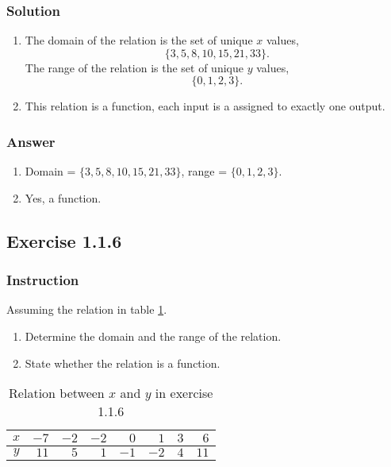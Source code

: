 \documentclass[11pt, letterpaper, oneside]{memoir}
\begin{document}
\subsubsection{Solution}

\begin{enumerate}[label=(\alph*)]
  \item The domain of the relation is the set of unique $ x $ values,
    $$ \phantom{.}
    \{ 3, 5, 8, 10, 15, 21, 33 \}
    .$$
    The range of the relation is the set of unique $ y $ values,
    $$ \phantom{.}
    \{ 0, 1, 2, 3\}
    .$$
  \item This relation is a function, each input is a assigned to exactly one output.
\end{enumerate}

\subsubsection{Answer}

\begin{enumerate}[label=(\alph*)]
  \item Domain = $  \{ 3, 5, 8, 10, 15, 21, 33 \} $, range = $ \{ 0, 1, 2, 3\} $.
  \item Yes, a function.
\end{enumerate}

\subsection*{Exercise 1.1.6}

\subsubsection{Instruction}

Assuming the relation in table \ref{table:exercise-1.1.6}.
\begin{enumerate}[label=(\alph*)]
  \item Determine the domain and the range of the relation.
  \item State whether the relation is a function.
\end{enumerate}

\begin{table}[ht]
  \centering
  \begin{tabular}{ c | r r r r r r r }
    \hline
    $ x $ & $ -7 $ & $ -2 $ & $ -2 $ & $ 0 $ & $ 1 $ & $ 3 $ & $ 6 $ \\
    \hline
    $ y $ & $ 11 $ & $ 5 $ & $ 1 $ & $ -1 $ & $ -2 $ & $ 4 $ & $ 11 $ \\
    \hline
  \end{tabular}
  \caption{Relation between $ x $ and $ y $ in exercise 1.1.6}
  \label{table:exercise-1.1.6}
\end{table}
\end{document}
